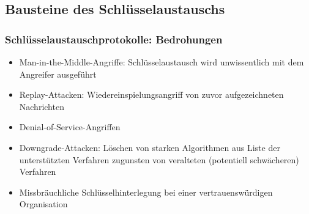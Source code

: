 \subsection{Bausteine des Schlüsselaustauschs}

\subsubsection{Schlüsselaustauschprotokolle: Bedrohungen}
\begin{itemize}
	\item Man-in-the-Middle-Angriffe: Schlüsselaustausch wird unwissentlich mit dem Angreifer ausgeführt
	\item Replay-Attacken: Wiedereinspielungsangriff von zuvor aufgezeichneten Nachrichten
	\item Denial-of-Service-Angriffen
	\item Downgrade-Attacken: Löschen von starken Algorithmen aus Liste der unterstützten Verfahren zugunsten von veralteten (potentiell schwächeren) Verfahren
	\item Missbräuchliche Schlüsselhinterlegung bei einer vertrauenswürdigen Organisation
\end{itemize}

